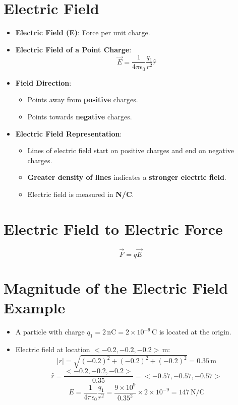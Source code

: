 \documentclass{article}
\begin{document}
\section*{Electric Field}
\begin{itemize}
    \item \textbf{Electric Field (E)}: Force per unit charge.
    \item \textbf{Electric Field of a Point Charge}:
    \[
    \vec{E} = \frac{1}{4 \pi \epsilon_0} \frac{q_1}{r^2} \hat{r}
    \]
    \item \textbf{Field Direction}:
    \begin{itemize}
        \item Points away from \textbf{positive} charges.
        \item Points towards \textbf{negative} charges.
    \end{itemize}
    \item \textbf{Electric Field Representation}:
    \begin{itemize}
        \item Lines of electric field start on positive charges and end on negative charges.
        \item \textbf{Greater density of lines} indicates a \textbf{stronger electric field}.
        \item Electric field is measured in \textbf{N/C}.
    \end{itemize}
\end{itemize}

\section*{Electric Field to Electric Force}
\[
\vec{F} = q \vec{E}
\]

\section*{Magnitude of the Electric Field Example}
\begin{itemize}
    \item A particle with charge \( q_1 = 2 \, \text{nC} = 2 \times 10^{-9} \, \text{C} \) is located at the origin.
    \item Electric field at location \( <-0.2, -0.2, -0.2> \, \text{m} \):
    \[
    |r| = \sqrt{(-0.2)^2 + (-0.2)^2 + (-0.2)^2} = 0.35 \, \text{m}
    \]
    \[
    \hat{r} = \frac{<-0.2, -0.2, -0.2>}{0.35} = <-0.57, -0.57, -0.57>
    \]
    \[
    E = \frac{1}{4 \pi \epsilon_0} \frac{q_1}{r^2} = \frac{9 \times 10^9}{0.35^2} \times 2 \times 10^{-9} = 147 \, \text{N/C}
    \]
\end{itemize}
\end{document}
